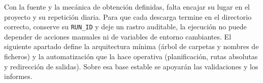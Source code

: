 Con la fuente y la mecánica de obtención definidas, falta encajar su lugar en el proyecto y su repetición diaria. Para que cada descarga termine en el directorio correcto, conserve su \texttt{RUN\_ID} y deje un rastro auditable, la ejecución no puede depender de acciones manuales ni de variables de entorno cambiantes. El siguiente apartado define la arquitectura mínima (árbol de carpetas y nombres de ficheros) y la automatización que la hace operativa (planificación, rutas absolutas y redirección de salidas). Sobre esa base estable se apoyarán las validaciones y los informes.
